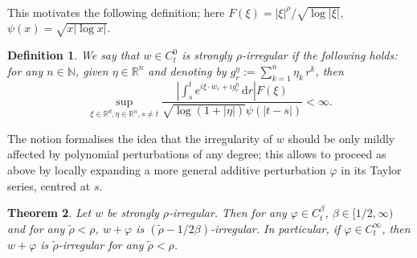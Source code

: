 \documentclass[10pt]{article}
\newcommand{\assign}{:=}
\newcommand{\mathd}{\mathrm{d}}
\newtheorem{theorem}{Theorem}%
\newtheorem{definition}[theorem]{Definition}
\begin{document}
\

This motivates the following definition; here $F (\xi) = | \xi |^{\rho} /
\sqrt{\log | \xi |}$, $\psi (x) = \sqrt{x | \log x |}$.

\begin{definition}
  \label{sec5.3 defn strong rho}We say that $w \in C^0_t$ is strongly
  $\rho$\mbox{-}irregular if the following holds: for any $n \in \mathbb{N}$,
  given $\eta \in \mathbb{R}^n$ and denoting by $g^{\eta}_r \assign \sum_{k =
  1}^n \eta_k \, r^k$, then
  \begin{equation}
    \sup_{\xi \in \mathbb{R}^d, \eta \in \mathbb{R}^n, s \neq t} \frac{\left|
    \int_s^t e^{i \xi \cdot w_r + i g^{\eta}_r} \, \mathd r \right| F
    (\xi)}{\sqrt{\log (1 + | \eta |)} \psi (| t - s |)} < \infty .
  \end{equation}
\end{definition}

The notion formalises the idea that the irregularity of $w$ should be only
mildly affected by polynomial perturbations of any degree; this allows to
proceed as above by locally expanding a more general additive perturbation
$\varphi$ in its Taylor series, centred at $s$.

\begin{theorem}
  \label{sec5.3 thm perturbation strong}Let $w$ be strongly $\rho$-irregular.
  Then for any $\varphi \in C^{\beta}_t$, $\beta \in [1 / 2, \infty)$ and for
  any $\tilde{\rho} < \rho$, $w + \varphi$ is $(\tilde{\rho} - 1 / 2
  \beta)$-irregular. In particular, if $\varphi \in C_t^{\infty}$, then $w +
  \varphi$ is $\tilde{\rho}$-irregular for any $\tilde{\rho} < \rho$.
\end{theorem}
\end{document}
